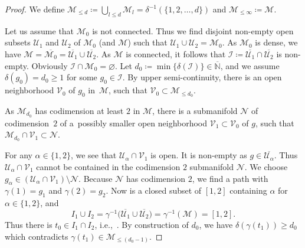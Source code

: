 \documentclass[11pt]{article}
\numberwithin{equation}{section}
\newcommand\ceq{\coloneqq}
\newcommand\<{\langle}
\renewcommand\>{\rangle}
\newcommand{\NN}{\mathbb N}
\let\ol\overline
\newcommand{\maI}{\mathcal I}
\newcommand{\maM}{\mathcal M}
\newcommand{\maN}{\mathcal N}
\newcommand{\maU}{\mathcal U}
\newcommand{\maV}{\mathcal V}
\theoremstyle{definition}
\newcommand\ie{i.e.,\ \ignorespaces}
\newcommand\={\,=\,}
\numberwithin{equation}{section}
\begin{document}
\begin{proof}
We define $\maM_{\leq d}\ceq \bigcup_{l\leq d}\maM_l=\delta^{-1}(\{1,2,\ldots,d\})$ and $\maM_{\leq \infty}\ceq \maM$.

Let us assume that $\maM_0$ is not connected.
Thus we find disjoint non-empty open subsets $\maU_1$ and $\maU_2$ of $\maM_0$ (and $\maM$) such that $\maU_1\cup \maU_2=\maM_0$.
As $\maM_0$ is dense, we have $\maM=\overline{\maM_0}=\overline{\maU_1}\cup \overline{\maU_2}$.
As $\maM$ is connected, it follows that $\maI\ceq \overline{\maU_1}\cap \overline{\maU_2}$ is non-empty.
Obviously $\maI\cap \maM_0=\varnothing$. Let $d_0\ceq\min\{\delta(\maI)\}\in \overline{\NN}$, and we assume $\delta(g_0)=d_0\geq 1$ for some $g_0\in \maI$.
By upper semi-continuity, there is an open neighborhood $\maV_0$ of $g_0$ in~$\maM$, such that $\maV_0\subset \maM_{\leq d_0}$.

As $\maM_{d_0}$ has codimension at least $2$ in $\maM$, there is a submanifold $\maN$ of codimension~$2$ of a~possibly smaller open neighborhood $\maV_1\subset \maV_0$ of $g$, such that $\maM_{d_0}\cap \maV_1\subset \maN$.

For any $\alpha\in \{1,2\}$, we see that $\maU_\alpha\cap \maV_1$ is open. It is non-empty as $g\in \overline{\maU_\alpha}$.
Thus $\maU_\alpha\cap \maV_1$ cannot be contained in the codimension $2$ submanifold $\maN$.
We choose $g_\alpha\in (\maU_\alpha\cap \maV_1)\setminus \maN$. Because $\maN$ has codimension $2$, we find a path \smash{$\gamma\colon[1,2]\to \maV_1\setminus \maN\subset \maM_{\leq (d_0-1)}$} with $\gamma(1)=g_1$ and $\gamma(2)=g_2$. Now \smash{$I_\alpha\ceq \gamma^{-1}\bigl(\ol{\maU_\alpha}\bigr)$} is a closed subset of $[1,2]$ containing $\alpha$ for $\alpha\in\{1,2\}$, and
\[
I_1\cup I_2= \gamma^{-1}\bigl(\ol{\maU_1}\cup \ol{\maU_2}\bigr)= \gamma^{-1}(\maM)=[1,2].
\]
Thus there is $t_0\in I_1\cap I_2$, \ie \smash{$\gamma(t_1)\in \ol{\maU_1}\cap \ol{\maU_2}=\maI$}. By construction of $d_0$, we have $\delta(\gamma(t_1))\geq d_0$ which contradicts $\gamma(t_1)\in\maM_{\leq (d_0-1)}$.
\end{proof}
\end{document}
